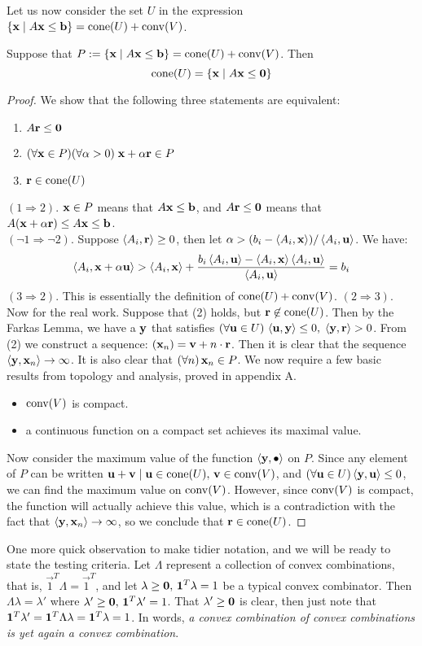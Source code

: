 Let us now consider the set $U$ in the expression $\left\{\mathbf{x}\;|\; A\mathbf{x}\leq\mathbf{b}\right\} = \operatorname{cone}(U) + \operatorname{conv}(V)$.
\begin{Prop}{\label{prop:ultz}
  Suppose that $P := \left\{\mathbf{x}\;|\; A\mathbf{x}\leq\mathbf{b}\right\} = \operatorname{cone}(U) + \operatorname{conv}(V)$.  Then
  \[ \operatorname{cone}(U) = \left\{\mathbf{x}\;|\; A\mathbf{x}\leq\mathbf{0}\right\} \]
} \end{Prop}
\begin{proof}
We show that the following three statements are equivalent:
\begin{enumerate}
  \item $A\mathbf{r}\leq\mathbf{0}$
  \item $(\forall \mathbf{x}\in P)(\forall \alpha > 0)\;\mathbf{x} + \alpha\mathbf{r} \in P$
  \item $\mathbf{r} \in \operatorname{cone}(U)$
\end{enumerate}
$(1 \Rightarrow 2)$. $\mathbf{x}\in P$ means that $A\mathbf{x}\leq\mathbf{b}$, and $A\mathbf{r}\leq\mathbf{0}$ means that $A(\mathbf{x}+\alpha\mathbf{r}) \leq A\mathbf{x} \leq \mathbf{b}$.\\
$(\neg 1 \Rightarrow \neg 2)$.  Suppose $\left\langle A_i, \mathbf{r} \right\rangle \geq 0$, then let $\alpha > (b_i - \left\langle A_i, \mathbf{x} \right\rangle)/\left\langle A_i, \mathbf{u} \right\rangle$.  We have:
  \[ \left\langle A_i, \mathbf{x} + \alpha\mathbf{u} \right\rangle > \left\langle A_i, \mathbf{x} \right\rangle + 
          \frac{b_i\left\langle A_i, \mathbf{u} \right\rangle - \left\langle A_i, \mathbf{x} \right\rangle\left\langle A_i, \mathbf{u} \right\rangle}{\left\langle A_i, \mathbf{u} \right\rangle} = b_i \]
$(3 \Rightarrow 2)$.  This is essentially the definition of $\operatorname{cone}(U) + \operatorname{conv}(V)$.
$(2 \Rightarrow 3)$.  Now for the real work.  Suppose that (2) holds, but $\mathbf{r}\not\in\operatorname{cone}(U)$.  Then by the Farkas Lemma, we have a $\mathbf{y}$ that satisfies $(\forall \mathbf{u}\in U)\,\left\langle \mathbf{u}, \mathbf{y} \right\rangle\leq 0,\; \left\langle \mathbf{y}, \mathbf{r} \right\rangle > 0$.  From (2) we construct a sequence: $(\mathbf{x}_n) = \mathbf{v}+n\cdot\mathbf{r}$.  Then it is clear that the sequence $\left\langle \mathbf{y}, \mathbf{x}_n \right\rangle \to \infty$.  It is also clear that $(\forall n)\,\mathbf{x}_n \in P$.  We now require a few basic results from topology and analysis, proved in appendix A.
\begin{itemize}
  \item $\operatorname{conv}(V)$ is compact.
  \item a continuous function on a compact set achieves its maximal value.
\end{itemize}
Now consider the maximum value of the function $\left\langle \mathbf{y}, \bullet \right\rangle$ on $P$.  Since any element of $P$ can be written $\mathbf{u} + \mathbf{v} \;|\; \mathbf{u}\in\operatorname{cone}(U),\,\mathbf{v}\in\operatorname{conv}(V)$, and $(\forall\mathbf{u}\in U) \left\langle \mathbf{y}, \mathbf{u} \right\rangle \leq 0$, we can find the maximum value on $\operatorname{conv}(V)$.  However, since $\operatorname{conv}(V)$ is compact, the function will actually achieve this value, which is a contradiction with the fact that $\left\langle \mathbf{y}, \mathbf{x}_n \right\rangle \to \infty$, so we conclude that $\mathbf{r}\in\operatorname{cone}(U)$.
\end{proof}

One more quick observation to make tidier notation, and we will be ready to state the testing criteria.  Let $\Lambda$ represent a collection of convex combinations, that is, $\vec{1}^T\Lambda = \vec{1}^T$, and let $\lambda\geq\mathbf{0},\,\mathbf{1}^T\lambda = 1$ be a typical convex combinator.  Then $\Lambda\lambda = \lambda'$ where $\lambda'\geq\mathbf{0},\,\mathbf{1}^T\lambda'=1$.  That $\lambda'\geq\mathbf{0}$ is clear, then just note that $\mathbf{1}^T\lambda' = \mathbf{1}^T\Lambda\lambda = \mathbf{1}^T\lambda = 1$.  In words, \textit{a convex combination of convex combinations is yet again a convex combination}.

